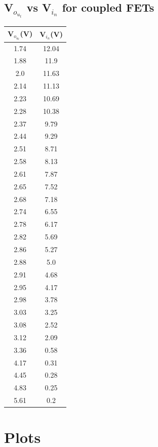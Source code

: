 \documentclass[12pt]{article}
\begin{document}
\subsection{V$_o_u_t$ vs V$_i_n$ for coupled FETs}
\begin{center}
 \begin{tabular}{|| c | c||} 
 \hline
 V$_o_u_t$(V) &  V$_i_n$(V)\\ [0.5ex] 
 \hline\hline
 1.74 & 12.04 \\
\hline
1.88 & 11.9 \\
\hline
2.0 & 11.63 \\
\hline
2.14 & 11.13 \\
\hline
2.23 & 10.69 \\
\hline
2.28 & 10.38 \\
\hline
2.37 & 9.79 \\
\hline
2.44 & 9.29 \\
\hline
2.51 & 8.71 \\
\hline
2.58 & 8.13 \\
\hline
2.61 & 7.87 \\
\hline
2.65 & 7.52 \\
\hline
2.68 & 7.18 \\
\hline
2.74 & 6.55 \\
\hline
2.78 & 6.17 \\
\hline
2.82 & 5.69 \\
\hline
2.86 & 5.27 \\
\hline
2.88 & 5.0 \\
\hline
2.91 & 4.68 \\
\hline
2.95 & 4.17 \\
\hline
2.98 & 3.78 \\
\hline
3.03 & 3.25 \\
\hline
3.08 & 2.52 \\
\hline
3.12 & 2.09 \\
\hline
3.36 & 0.58 \\
\hline
4.17 & 0.31 \\
\hline
4.45 & 0.28 \\
\hline
4.83 & 0.25 \\
\hline
5.61 & 0.2 \\
\hline

 


\end{tabular}
\end{center}
 
 
 

\section*{Plots}
\end{document}
